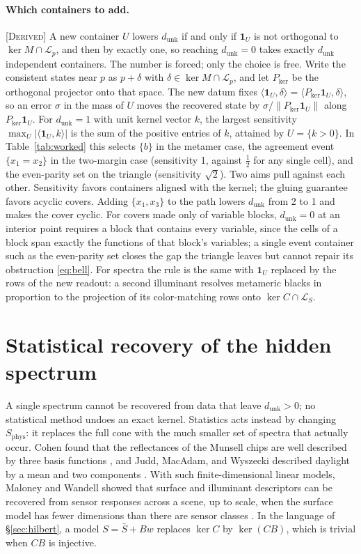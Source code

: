 \documentclass[11pt]{article}
\theoremstyle{boldplain}
\theoremstyle{boldupright}
\newcommand{\derived}{[\textup{\textsc{Derived}}]}
\newcommand{\one}{\mathbf{1}}
\newcommand{\dunk}{d_{\mathrm{unk}}}
\newcommand{\Sphys}{S_{\mathrm{phys}}}
\begin{document}
\paragraph{Which containers to add.} \derived{} A new container $U$ lowers $\dunk$ if and only if $\one_U$ is not
orthogonal to $\ker M\cap\mathcal{L}_p$, and then by exactly one, so reaching $\dunk=0$ takes exactly $\dunk$ independent
containers. The number is forced; only the choice is free. Write the consistent states near $p$ as $p+\delta$
with $\delta\in\ker M\cap\mathcal{L}_p$, and let $P_{\ker}$ be the orthogonal projector onto that space. The new datum fixes
$\langle\one_U,\delta\rangle=\langle P_{\ker}\one_U,\delta\rangle$, so an error $\sigma$ in the mass of $U$ moves the recovered state by $\sigma/\|P_{\ker}\one_U\|$ along
$P_{\ker}\one_U$. For $\dunk=1$ with unit kernel vector $k$, the largest sensitivity $\max_U|\langle\one_U,k\rangle|$ is the sum of the
positive entries of $k$, attained by $U=\{k>0\}$. In Table~\ref{tab:worked} this selects $\{b\}$ in the metamer case, the
agreement event $\{x_1=x_2\}$ in the two-margin case (sensitivity 1, against $\tfrac12$ for any single cell), and the
even-parity set on the triangle (sensitivity $\sqrt2$). Two aims pull against each other. Sensitivity favors
containers aligned with the kernel; the gluing guarantee favors acyclic covers. Adding $\{x_1,x_3\}$ to the path
lowers $\dunk$ from 2 to 1 and makes the cover cyclic. For covers made only of variable blocks, $\dunk=0$ at an
interior point requires a block that contains every variable, since the cells of a block span exactly the
functions of that block's variables; a single event container such as the even-parity set closes the gap the
triangle leaves but cannot repair its obstruction \eqref{eq:bell}. For spectra the rule is the same with $\one_U$ replaced
by the rows of the new readout: a second illuminant resolves metameric blacks in proportion to the
projection of its color-matching rows onto $\ker C\cap\mathcal{L}_S$.

\section{Statistical recovery of the hidden spectrum}\label{sec:stat}

A single spectrum cannot be recovered from data that leave $\dunk>0$; no statistical method undoes
an exact kernel. Statistics acts instead by changing $\Sphys$: it replaces the full cone with the much
smaller set of spectra that actually occur. Cohen found that the reflectances of the Munsell chips are
well described by three basis functions \cite{cohen1964}, and Judd, MacAdam, and Wyszecki described daylight
by a mean and two components \cite{judd1964}. With such finite-dimensional linear models, Maloney and
Wandell showed that surface and illuminant descriptors can be recovered from sensor responses
across a scene, up to scale, when the surface model has fewer dimensions than there are sensor
classes \cite{maloney1986}. In the language of \S\ref{sec:hilbert}, a model $S=\bar S+Bw$ replaces $\ker C$ by $\ker(CB)$, which is trivial
when $CB$ is injective.
\end{document}
